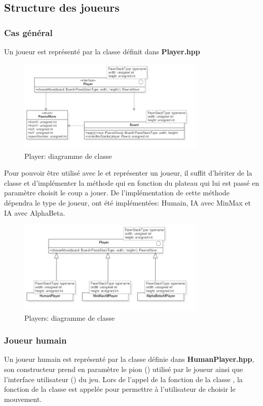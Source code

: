 \documentclass[article, backcover, french, nodocumentinfo]{upmethodology-document}
\begin{document}
		\subsection{Structure des joueurs}
			\subsubsection{Cas général}
					Un joueur est représenté par la classe  définit dans \textbf{Player.hpp}
					\begin{figure}[H]
						\centering
						\includegraphics[width=0.8\textwidth]{figures/PlayerDiagram}
						\caption{Player: diagramme de classe}
						\label{fig:PlayerDiagram}
					\end{figure}
					Pour pouvoir être utilisé avec le  et représenter un joueur, il suffit d'hériter de la classe  et d'implémenter la méthode  qui en fonction du plateau qui lui est passé en paramètre choisit le coup a jouer. De l'implémentation de cette méthode dépendra le type de joueur, ont été implémentées: Humain, IA avec MinMax et IA avec AlphaBeta.
					\begin{figure}[H]
						\centering
						\includegraphics[width=0.8\textwidth]{figures/PlayersDiagram}
						\caption{Players: diagramme de classe}
						\label{fig:PlayersDiagram}
					\end{figure}
			\subsubsection{Joueur humain}
					Un joueur humain est représenté par la classe  définie dans \textbf{HumanPlayer.hpp}, son constructeur prend en paramètre le pion () utilisé par le joueur ainsi que l'interface utilisateur () du jeu.
					Lors de l'appel de la fonction  de la classe , la fonction  de la classe  est appelée pour permettre à l'utilisateur de choisir le mouvement.
\end{document}
